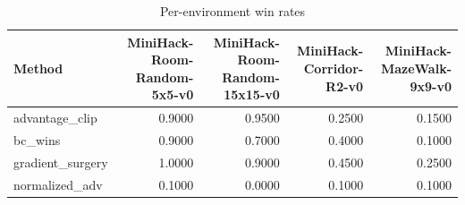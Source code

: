 \begin{table}[htbp]
\centering
\caption{Per-environment win rates}
\label{tab:per-env}
\begin{tabular}{lrrrr}
\toprule
\textbf{Method} & \textbf{MiniHack-Room-Random-5x5-v0} & \textbf{MiniHack-Room-Random-15x15-v0} & \textbf{MiniHack-Corridor-R2-v0} & \textbf{MiniHack-MazeWalk-9x9-v0} \\
\midrule
advantage\_clip & 0.9000 & 0.9500 & 0.2500 & 0.1500 \\
bc\_wins & 0.9000 & 0.7000 & 0.4000 & 0.1000 \\
gradient\_surgery & 1.0000 & 0.9000 & 0.4500 & 0.2500 \\
normalized\_adv & 0.1000 & 0.0000 & 0.1000 & 0.1000 \\
\bottomrule
\end{tabular}
\end{table}